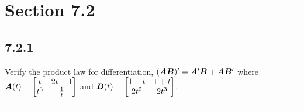 \documentclass{article}
\begin{document}
\newcommand{\hr}{\par\noindent\rule{\textwidth}{0.4pt}}

\newcommand{\bc}[1]{
	\begin{equation*}
		\begin{boxed}
			{#1}
		\end{boxed}
	\end{equation*}
}

\newcommand{\cond}[2]{
	\ifmmode
		{#1} \quad {#2}
	\else
		$$ {#1} \quad {#2} $$
	\fi
}

\newcommand{\matr}[1]{
	\ifmmode \bm{#1}
	\else \textit{\textbf{#1}}
	\fi
}
\newcommand{\vect}[1]{
	\ifmmode \mathbf{#1}
	\else \textbf{#1}
	\fi
}

\section{Section 7.2}

\subsection{7.2.1}

Verify the product law for differentiation, $ (\matr{A}\matr{B})' = \matr{A}'\matr{B} + \matr{A}\matr{B}' $ where $ \matr{A}(t) = \begin{bmatrix} t & 2t - 1 \\ t^3 & \frac{1}{t} \end{bmatrix} $ and $ \matr{B}(t) = \begin{bmatrix} 1 - t & 1 + t \\ 2t^2 & 2t^3 \end{bmatrix} $.

\hr
\end{document}
